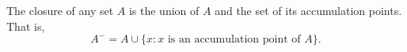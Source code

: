 The closure of any set $A$ is the union of $A$ and the set of its accumulation points. That is,
$$A^{-} = A \cup \{x : x \text{ is an accumulation point of } A\}.$$
